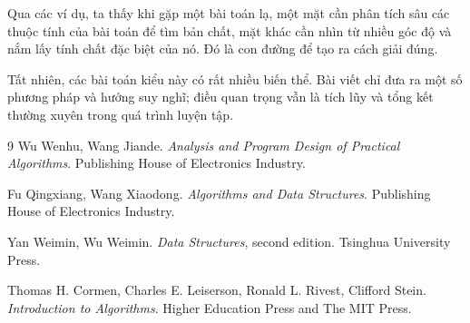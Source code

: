 \documentclass[11pt]{article}
\begin{document}
Qua các ví dụ, ta thấy khi gặp một bài toán lạ, một mặt cần phân tích sâu các
thuộc tính của bài toán để tìm bản chất, mặt khác cần nhìn từ nhiều góc độ và
nắm lấy tính chất đặc biệt của nó. Đó là con đường để tạo ra cách giải đúng.

Tất nhiên, các bài toán kiểu này có rất nhiều biến thể. Bài viết chỉ đưa ra
một số phương pháp và hướng suy nghĩ; điều quan trọng vẫn là tích lũy và tổng
kết thường xuyên trong quá trình luyện tập.

\begin{thebibliography}{9}
Wu Wenhu, Wang Jiande. \emph{Analysis and Program Design of Practical
Algorithms}. Publishing House of Electronics Industry.

Fu Qingxiang, Wang Xiaodong. \emph{Algorithms and Data Structures}. Publishing
House of Electronics Industry.

Yan Weimin, Wu Weimin. \emph{Data Structures}, second edition. Tsinghua
University Press.

Thomas H. Cormen, Charles E. Leiserson, Ronald L. Rivest, Clifford Stein.
\emph{Introduction to Algorithms}. Higher Education Press and The MIT Press.
\end{thebibliography}
\end{document}
